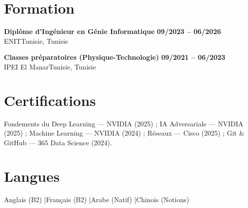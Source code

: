 \documentclass[a4paper,8pt]{article}
\newcommand{\cventry}[4]{\textbf{#1} \hfill \textbf{#4}\\[0.3pt]#2{\ifx\relax#3\relax\else, #3\fi}\par\vspace{0.3pt}}
\begin{document}
\section{Formation}
\cventry{Diplôme d'Ingénieur en Génie Informatique}{ENIT}{Tunisie}{09/2023 -- 06/2026}
\cventry{Classes préparatoires (Physique-Technologie)}{IPEI El Manar}{Tunisie}{09/2021 -- 06/2023}
\section{Certifications}
Fondements du Deep Learning --- NVIDIA (2025) ; IA Adversariale --- NVIDIA (2025) ; Machine Learning --- NVIDIA (2024) ; Réseaux --- Cisco (2025) ; Git \& GitHub --- 365 Data Science (2024).
\section{Langues}
Anglais (B2) \quad|\quad Français (B2) \quad|\quad Arabe (Natif) \quad|\quad Chinois (Notions)
\end{document}
